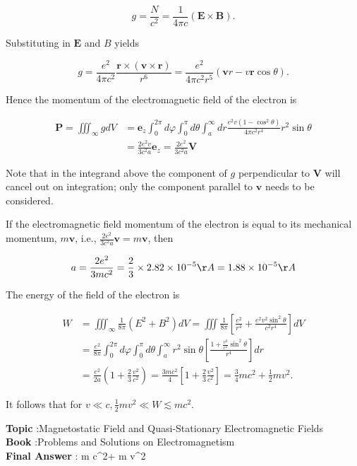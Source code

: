 \documentclass[10pt]{article}
\begin{document}
$$
g=\frac{N}{c^{2}}=\frac{1}{4 \pi c}(\mathbf{E} \times \mathbf{B}) .
$$

Substituting in $\mathbf{E}$ and $B$ yields

$$
g=\frac{e^{2}}{4 \pi c^{2}} \frac{\mathbf{r} \times(\mathbf{v} \times \mathbf{r})}{r^{6}}=\frac{e^{2}}{4 \pi c^{2} r^{5}}(\mathbf{v} r-v \mathbf{r} \cos \theta) .
$$

Hence the momentum of the electromagnetic field of the electron is

$$
\begin{aligned}
\mathbf{P}=\iiint_{\infty} g d V &=\mathbf{e}_{z} \int_{0}^{2 \pi} d \varphi \int_{0}^{\pi} d \theta \int_{a}^{\infty} d r \frac{e^{2} v\left(1-\cos ^{2} \theta\right)}{4 \pi c^{2} r^{4}} r^{2} \sin \theta \\
&=\frac{2 e^{2} v}{3 c^{2} a} \mathbf{e}_{z}=\frac{2 e^{2}}{3 c^{2} a} \mathbf{V}
\end{aligned}
$$

Note that in the integrand above the component of $g$ perpendicular to $\mathbf{V}$ will cancel out on integration; only the component parallel to $\mathbf{v}$ needs to be considered.

If the electromagnetic field momentum of the electron is equal to its mechanical momentum, $m \mathbf{v}$, i.e., $\frac{2 e^{2}}{3 c^{2} a} \mathbf{v}=m \mathbf{v}$, then

$$
a=\frac{2 e^{2}}{3 m c^{2}}=\frac{2}{3} \times 2.82 \times 10^{-5} \AA=1.88 \times 10^{-5} \AA
$$

 The energy of the field of the electron is

$$
\begin{aligned}
W &=\iiint_{\infty} \frac{1}{8 \pi}\left(E^{2}+B^{2}\right) d V=\iiint \frac{1}{8 \pi}\left[\frac{e^{2}}{r^{4}}+\frac{e^{2} v^{2} \sin ^{2} \theta}{c^{2} r^{4}}\right] d V \\
&=\frac{e^{2}}{8 \pi} \int_{0}^{2 \pi} d \varphi \int_{0}^{\pi} d \theta \int_{a}^{\infty} r^{2} \sin \theta\left[\frac{1+\frac{v^{2}}{c^{2}} \sin ^{2} \theta}{r^{4}}\right] d r \\
&=\frac{e^{2}}{2 a}\left(1+\frac{2}{3} \frac{v^{2}}{c^{2}}\right)=\frac{3 m c^{2}}{4}\left[1+\frac{2}{3} \frac{v^{2}}{c^{2}}\right]=\frac{3}{4} m c^{2}+\frac{1}{2} m v^{2} .
\end{aligned}
$$

It follows that for $v \ll c, \frac{1}{2} m v^{2} \ll W \lesssim m c^{2}$.

\textbf{Topic} :Magnetostatic Field and Quasi-Stationary Electromagnetic Fields\\
\textbf{Book} :Problems and Solutions on Electromagnetism\\
\textbf{Final Answer} : m c^{2}+ m v^{2}\\
\end{document}
